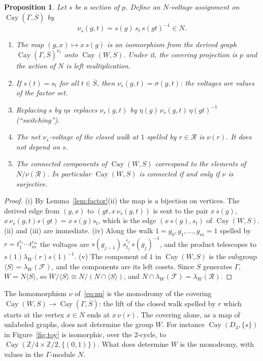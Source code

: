 \documentclass[12pt,letterpaper]{article}
\numberwithin{equation}{section}
\theoremstyle{plain}
\newtheorem{proposition}[theorem]{Proposition}
\theoremstyle{definition}
\newcommand{\Z}{\mathbb{Z}}
\newcommand{\fr}{\mathcal{F}}             %
\newcommand{\rel}{\mathcal{R}}            %
\DeclareMathOperator{\Cay}{Cay}
\begin{document}
\begin{proposition}\label{prop:derived}
Let $s$ be a section of $p$. Define an $N$-voltage assignment on
$\Cay(\Gamma,\overline{S})$ by
\[
\nu_s(g,t)=s(g)\,s_t\,s(gt)^{-1}\in N .
\]
\begin{enumerate}[label=\textup{(\roman*)},itemsep=1pt]
\item The map $(g,x)\mapsto x\,s(g)$ is an isomorphism from the derived
graph $\Cay(\Gamma,\overline{S})^{\nu_s}$ onto $\Cay(W,S)$. Under it, the
covering projection is $p$ and the action of $N$ is left multiplication.
\item If $s(t)=s_t$ for all $t\in\overline{S}$, then
$\nu_s(g,t)=\sigma(g,t)$: the voltages are values of the factor set.
\item Replacing $s$ by $\eta s$ replaces $\nu_s(g,t)$ by
$\eta(g)\,\nu_s(g,t)\,\eta(gt)^{-1}$ \textup{(}``switching''\textup{)}.
\item The net $\nu_s$-voltage of the closed walk at $1$ spelled by
$r\in\rel$ is $\nu(r)$. It does not depend on $s$.
\item The connected components of $\Cay(W,S)$ correspond to the elements
of $N/\nu(\rel)$. In particular $\Cay(W,S)$ is connected if and only if
$\nu$ is surjective.
\end{enumerate}
\end{proposition}

\begin{proof}
(i) By Lemma~\ref{lem:factor}(ii) the map is a bijection on vertices. The
derived edge from $(g,x)$ to $(gt,x\,\nu_s(g,t))$ is sent to the pair
$x\,s(g)$, $x\,\nu_s(g,t)s(gt)=x\,s(g)s_t$, which is the edge
$(x\,s(g),s_t)$ of $\Cay(W,S)$. (ii) and (iii) are immediate. (iv) Along
the walk $1=g_0,g_1,\dots,g_m=1$ spelled by
$r=t_1^{\epsilon_1}\cdots t_m^{\epsilon_m}$ the voltages are
$s(g_{j-1})\,s_{t_j}^{\epsilon_j}\,s(g_j)^{-1}$, and the product
telescopes to $s(1)\lambda_W(r)s(1)^{-1}$. (v) The component of $1$ in
$\Cay(W,S)$ is the subgroup $\langle S\rangle=\lambda_W(\fr)$, and the
components are its left cosets. Since $\overline{S}$ generates $\Gamma$,
$W=N\langle S\rangle$, so $W/\langle S\rangle\cong N/(N\cap\langle
S\rangle)$, and $N\cap\lambda_W(\fr)=\lambda_W(\rel)$.
\end{proof}

The homomorphism $\nu$ of~\eqref{eq:nu} is the monodromy of the covering
$\Cay(W,S)\to\Cay(\Gamma,\overline{S})$: the lift of the closed walk
spelled by $r$ which starts at the vertex $x\in N$ ends at $x\,\nu(r)$.
The covering alone, as a map of unlabeled graphs, does not determine the
group $W$. For instance $\Cay(D_4,\{s\})$ in Figure~\ref{fig:toy} is
isomorphic, over the $2$-cycle, to $\Cay(\Z/4\times\Z/2,\{(0,1)\})$. What
does determine $W$ is the monodromy, with values in the $\Gamma$-module
$N$.
\end{document}
